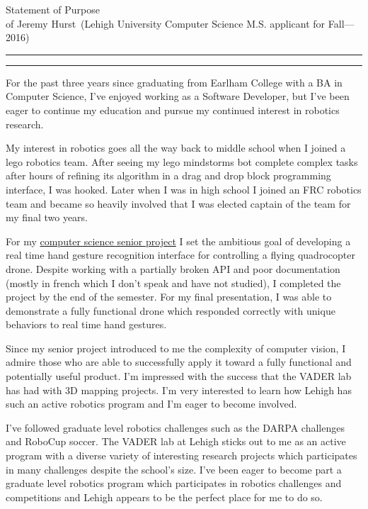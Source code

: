 \documentclass{article}
\newcommand{\soptitle}{Statement of Purpose}
\newcommand{\yourname}{Jeremy Hurst}
\newcommand{\statement}[1]{\par\medskip
  \underline{\textcolor{blue}{\textbf{#1:}}}\space
}
\begin{document}
\begin{center}\LARGE\soptitle\\
\large of \yourname\ (Lehigh University Computer Science M.S. applicant for Fall---2016)
\end{center}

\hrule
\vspace{1pt}
\hrule height 1pt

\bigskip

For the past three years since graduating from Earlham College with a BA in Computer Science, I've enjoyed working as a Software Developer, but I've been eager to continue my education and pursue my continued interest in robotics research.

My interest in robotics goes all the way back to middle school when I joined a lego robotics team. After seeing my lego mindstorms bot complete complex tasks after hours of refining its algorithm in a drag and drop block programming interface, I was hooked. Later when I was in high school I joined an FRC robotics team and became so heavily involved that I was elected captain of the team for my final two years.

For my \href{https://www.youtube.com/watch?v=69phrToFKyI}{computer science senior project} I set the ambitious goal of developing a real time hand gesture recognition interface for controlling a flying quadrocopter drone. Despite working with a partially broken API and poor documentation (mostly in french which I don't speak and have not studied), I completed the project by the end of the semester. For my final presentation, I was able to demonstrate a fully functional drone which responded correctly with unique behaviors to real time hand gestures.

Since my senior project introduced to me the complexity of computer vision, I admire those who are able to successfully apply it toward a fully functional and potentially useful product. I'm impressed with the success that the VADER lab has had with 3D mapping projects. I'm very interested to learn how Lehigh has such an active robotics program and I'm eager to become involved.

I've followed graduate level robotics challenges such as the DARPA challenges and RoboCup soccer. The VADER lab at Lehigh sticks out to me as an active program with a diverse variety of interesting research projects which participates in many challenges despite the school's size. I've been eager to become part a graduate level robotics program which participates in robotics challenges and competitions and Lehigh appears to be the perfect place for me to do so.
\end{document}
